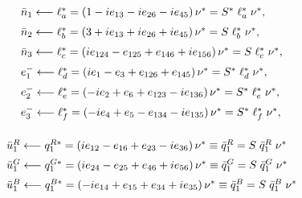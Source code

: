 \documentclass[letterpaper,12pt,titlepage,oneside,final]{book}
\newcommand{\spacer}{0.2cm}
\begin{document}
\begin{equation}\begin{array}{l}\label{newantilept}
\bar{n}_1\longleftarrow\ell_{a}^*=\left(1-ie_{13}-ie_{26}-ie_{45}\right)\nu^* = S^*\hspace{1mm}\ell_{a}^*\hspace{1mm}\nu^*,  \vspace{\spacer}\\
 \bar{n}_2\longleftarrow \ell_{b}^*=\left(3+ie_{13}+ie_{26}+ie_{45}\right)\nu^*= S\hspace{1mm}\ell_{b}^*\hspace{1mm}\nu^*, \vspace{\spacer}\\
\bar{n}_3\longleftarrow\ell_{c}^*= \left(ie_{124}-e_{125}+e_{146}+ie_{156}\right)\nu^*= S\hspace{1mm}\ell_{c}^*\hspace{1mm}\nu^*, \vspace{\spacer} \\
e^-_1\longleftarrow\ell_{d}^*= \left(ie_{1}-e_{3}+e_{126}+e_{145}\right)\nu^*= S^*\hspace{1mm}\ell_{d}^*\hspace{1mm}\nu^*, \vspace{\spacer} \\
e^-_2\longleftarrow\ell_{e}^*= \left(-ie_{2}+e_{6}+e_{123}-ie_{136}\right)\nu^*= S^*\hspace{1mm}\ell_{e}^*\hspace{1mm}\nu^*, \vspace{\spacer} \\
e^-_3\longleftarrow\ell_{f}^*= \left(-ie_{4}+e_{5}-e_{134}-ie_{135}\right)\nu^*= S^*\hspace{1mm}\ell_{f}^*\hspace{1mm}\nu^*, \vspace{\spacer} \\
\end{array}\end{equation}

\begin{equation}\begin{array}{l}\label{newantitriplet}
\bar{u}_1^R\longleftarrow q^{R*}_{1}=\left(ie_{12}-e_{16}+e_{23}-ie_{36}\right)\nu^* \equiv\bar{q}^R_1= S\hspace{1mm}\bar{q}^R_1\hspace{1mm}\nu^*   \vspace{\spacer} \\
\bar{u}_1^G\longleftarrow q^{G*}_{1}=\left(ie_{24}-e_{25}+e_{46}+ie_{56}\right)\nu^* \equiv\bar{q}^G_1= S\hspace{1mm}\bar{q}^G_1\hspace{1mm}\nu^* \vspace{\spacer} \\
\bar{u}_1^B\longleftarrow q^{B*}_{1}=\left(-ie_{14}+e_{15}+e_{34}+ie_{35}\right)\nu^* \equiv\bar{q}^B_1= S\hspace{1mm}\bar{q}^B_1\hspace{1mm}\nu^* \vspace{\spacer} \\
\end{array}\end{equation}
\end{document}
